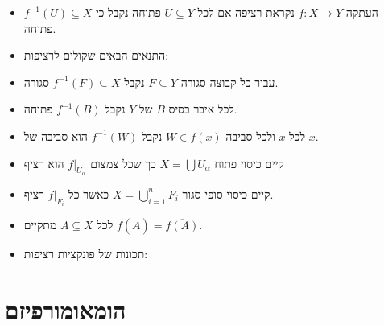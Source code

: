 \documentclass{tstextbook}
\begin{document}
\begin{summary}
  \begin{itemize}
    \item העתקה \(f:X\to Y\) נקראת רציפה אם לכל \(U \subseteq Y\) פתוחה נקבל כי \(f^{-1}(U)\subseteq X\) פתוחה.
    \item התנאים הבאים שקולים לרציפות:


    \item עבור כל קבוצה סגורה \(F \subseteq Y\) נקבל \(f^{-1}(F)\subseteq X\) סגורה. 


    \item לכל איבר בסיס \(B\) של \(Y\) נקבל \(f^{-1}(B)\) פתוחה. 


    \item לכל \(x\) ולכל סביבה \(W\in f(x)\) נקבל \(f^{-1}(W)\) הוא סביבה של \(x\). 


    \item קיים כיסוי פתוח \(X=\bigcup U_{\alpha}\) כך שכל צמצום \(f|_{U_{\alpha}}\) הוא רציף 


    \item קיים כיסוי סופי סגור \(X=\bigcup_{i=1}^{n}F_{i}\) כאשר כל \(f|_{F_{i}}\) רציף. 


    \item לכל \(A\subseteq X\) מתקיים \(f\left( \overline{A} \right)=\overline{f(A)}\). 


    \item תכונות של פונקציות רציפות:
  \end{itemize}
\end{summary}
\section{הומאומורפיזם}
\end{document}
